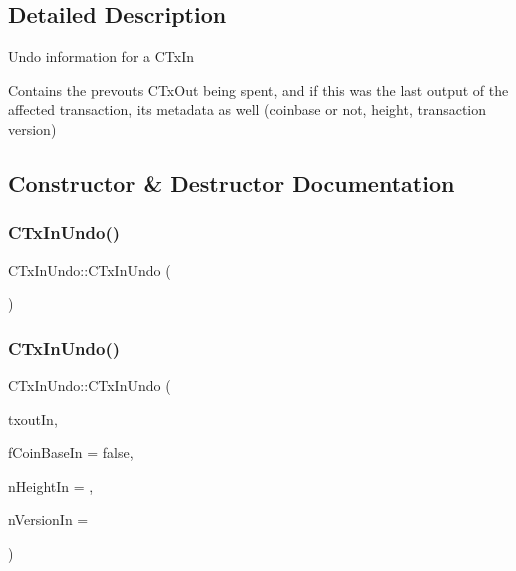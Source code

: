 \subsection{Detailed Description}
Undo information for a C\+Tx\+In

Contains the prevout\textquotesingle{}s C\+Tx\+Out being spent, and if this was the last output of the affected transaction, its metadata as well (coinbase or not, height, transaction version) 

\subsection{Constructor \& Destructor Documentation}
\mbox{\label{class_c_tx_in_undo_a9f8d4a16f1cb14fcec729becdb944003}} 
\subsubsection{\texorpdfstring{C\+Tx\+In\+Undo()}{CTxInUndo()}\hspace{0.1cm}{\footnotesize\ttfamily [1/2]}}
{\footnotesize\ttfamily C\+Tx\+In\+Undo\+::\+C\+Tx\+In\+Undo (\begin{DoxyParamCaption}{ }\end{DoxyParamCaption})\hspace{0.3cm}{\ttfamily [inline]}}

\mbox{\label{class_c_tx_in_undo_a9f4da076d789bf5fa3f6d8d4b1d7d6fd}} 
\subsubsection{\texorpdfstring{C\+Tx\+In\+Undo()}{CTxInUndo()}\hspace{0.1cm}{\footnotesize\ttfamily [2/2]}}
{\footnotesize\ttfamily C\+Tx\+In\+Undo\+::\+C\+Tx\+In\+Undo (\begin{DoxyParamCaption}\item[{const C\+Tx\+Out \&}]{txout\+In,  }\item[{bool}]{f\+Coin\+Base\+In = {\ttfamily false},  }\item[{unsigned int}]{n\+Height\+In = {},  }\item[{int}]{n\+Version\+In = {} }\end{DoxyParamCaption})\hspace{0.3cm}{\ttfamily [inline]}}



